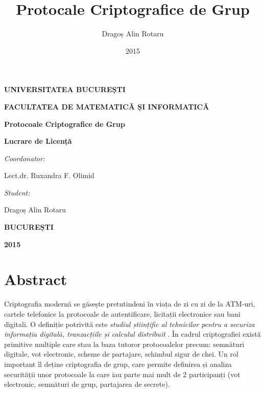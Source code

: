 \documentclass[oneside, 12pt]{book}
\title{Protocale Criptografice de Grup}
\author{Dragoș Alin Rotaru}
\date{2015}
\begin{document}
\thispagestyle{empty}

\nocite*{}

\begin{center}
\centerline{\bf UNIVERSITATEA BUCUREȘTI}
\centerline{\bf FACULTATEA DE MATEMATICĂ ȘI INFORMATICĂ}

\end{center}
\vspace{4.5cm}

\centerline{\huge \bf Protocoale Criptografice de Grup}

\vspace{0.5cm}

\centerline{\large \bf Lucrare de Licență}

\vspace{3.5cm}

\begin{flushleft}
{\Large \textit{Coordonator:}\vspace{0.2cm}}

{\Large Lect.dr. Ruxandra F. Olimid}
\end{flushleft}

\vspace{1cm}
\begin{flushright}
{\Large \textit{Student:}\vspace{0.2cm}}

{\Large Dragoș Alin Rotaru}
\end{flushright}


\vspace{2cm}

\centerline{\bf BUCUREȘTI}

\centerline{\bf 2015}

\chapter*{Abstract}

\hspace*{5mm} Criptografia modernă se găsește pretutindeni în viața de zi cu zi de la ATM-uri, cartele telefonice la protocoale de autentificare, licitații electronice sau bani digitali. O definiție potrivită este \textit{studiul științific al tehnicilor pentru a securiza informația digitală, tranzacțiile și calculul distribuit} \cite{Katz:2007}. În cadrul criptografiei există primitive multiple care stau la baza tutoror protocoalelor precum: semnături digitale, vot electronic, scheme de partajare, schimbul sigur de chei. Un rol important îl deține criptografia de grup, care permite definirea și analiza securității unor protocoale la care iau parte mai mult de 2 participanți (vot electronic, semnături de grup, partajarea de secrete).
\end{document}
